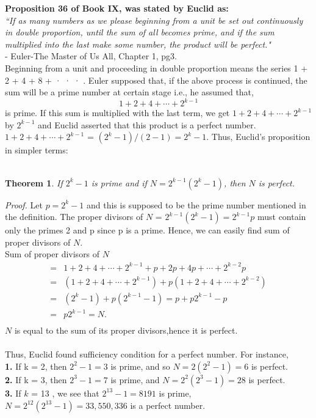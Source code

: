 \documentclass[a4paper,reqno,11pt]{book}
\theoremstyle{plain}%
\newtheorem{thm}{Theorem}[chapter]
\theoremstyle{definition}
\begin{document}
\noindent \textbf{Proposition 36 of Book IX, was stated by Euclid as: }\\

\textit{``If as many numbers as we please beginning from a unit be set out 
continuously in double proportion, until the sum of all becomes 
prime, and if the sum multiplied into the last make some number, the 
product will be perfect."}\\
\vspace{2ex}
\hfill {- Euler-The Master of Us All, Chapter 1, pg3.}
\\
Beginning from a unit and proceeding in double 
proportion means the series 1 + 2 + 4 + 8 + · · · . 
Euler supposed that, if the above process is continued, the sum will be a prime 
number at certain stage i.e., he assumed that,\\
$$1 + 2 + 4 +\cdots+2^{k
-
1}$$ is prime. 
If this sum is multiplied with the last term, we get 
$1 + 2 + 4 + \cdots + 2^
{k
- 1}$ by $ 2^
{k- 1}$ and Euclid
asserted that this product is a perfect number. \\
 $ 1 + 2 + 4 + \cdots + 2^{
k
- 1}$  = $(2^k - 1 )/(2 - 1) = 2^
k - 1.$ Thus, Euclid's 
proposition in simpler terms:\\
\\
\begin{thm}\label{thm:Type 1} If $2^k - 1$ is prime and if $N = 2^{
k-1}
(2^k - 1)$, then $N $ is perfect. \\
\end{thm}
\textit{Proof.} Let $p = 2^k - 1 $ and this is supposed to be the prime number mentioned in the definition. The 
proper divisors of $N$ = $2^
{k-1}(2^k - 1) = 2^{
k
- 1}p$ must  contain only 
the primes 2 and p since p is a prime. Hence, we can easily find sum of proper divisors of $N$. \\
Sum of proper divisors of $ N $
\begin{align*}
=& 1 + 2 + 4 +\cdots + 2^{k- 1} + p + 2p + 4p + \cdots + 2^{k-2} p \\
=& (1 + 2 + 4 + \cdots+ 2^{k- 1}) + p(1 + 2 + 4 + \cdots+ 2^{k-2})\\
=& (2^k -1) + p(2^{k- 1}- 1) = p + p2^{k- 1} - p \\
=& p2^{k- 1} = N.\\
\end{align*}
$ N $ is equal to the sum of its proper divisors,hence it is perfect.\\
\\
Thus, Euclid found sufficiency condition for a perfect number. For instance,\\ \textbf{1.} If k = 2, then $2^
2 -1 = 3$ is prime, and so $N= 2(2^2 -1) = 
6$ is perfect.\\ \textbf{2.} If k = 3, then $2^
3 - 1 = 7$ is prime, and 
$N = 2^2(2^3 -1) = 28$ is perfect.\\ \textbf{3.} If $k$ = 13 , we see that $2^{13}-1 = 8191$ is prime, 
 $ N = 2^{12}(2^{13}-1) = 33,550,336$ is a perfect number.\\
  \\
\end{document}
